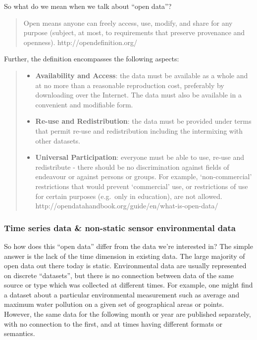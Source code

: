 So what do we mean when we talk about ``open data''?

\begin{quote}
Open means anyone can freely access, use, modify, and share for any
purpose (subject, at most, to requirements that preserve provenance and
openness). http://opendefinition.org/
\end{quote}

Further, the definition encompasses the following aspects:

\begin{quote}
\begin{itemize}
\tightlist
\item
  \textbf{Availability and Access}: the data must be available as a
  whole and at no more than a reasonable reproduction cost, preferably
  by downloading over the Internet. The data must also be available in a
  convenient and modifiable form.
\item
  \textbf{Re-use and Redistribution}: the data must be provided under
  terms that permit re-use and redistribution including the intermixing
  with other datasets.
\item
  \textbf{Universal Participation}: everyone must be able to use, re-use
  and redistribute - there should be no discrimination against fields of
  endeavour or against persons or groups. For example, `non-commercial'
  restrictions that would prevent `commercial' use, or restrictions of
  use for certain purposes (e.g.~only in education), are not allowed.
  http://opendatahandbook.org/guide/en/what-is-open-data/
\end{itemize}
\end{quote}

\subsubsection{Time series data \& non-static sensor environmental
data}\label{time-series-data-non-static-sensor-environmental-data}

So how does this ``open data'' differ from the data we're interested in?
The simple answer is the lack of the time dimension in existing data.
The large majority of open data out there today is static. Environmental
data are usually represented on discrete ``datasets'', but there is no
connection between data of the same source or type which was collected
at different times. For example, one might find a dataset about a
particular environmental measurement such as average and maximum water
pollution on a given set of geographical areas or points. However, the
same data for the following month or year are published separately, with
no connection to the first, and at times having different formats or
semantics.

